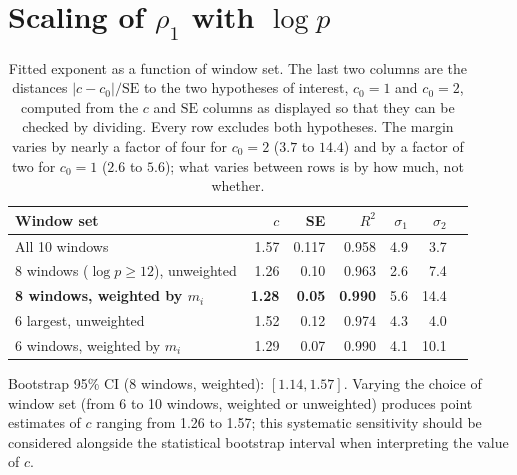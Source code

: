 \documentclass[11pt]{article}
\begin{document}
\section{Scaling of $\rho_1$ with $\log p$}\label{sec:scaling}

\begin{table}[H]\centering
\caption{Fitted exponent as a function of window set. The last two
columns are the distances $|c - c_0|/\mathrm{SE}$ to the two hypotheses
of interest, $c_0 = 1$ and $c_0 = 2$, computed from the $c$ and
$\mathrm{SE}$ columns as displayed so that they can be checked by
dividing. Every row excludes both hypotheses. The margin varies by
nearly a factor of four for $c_0 = 2$ ($3.7$ to $14.4$) and by a factor
of two for $c_0 = 1$ ($2.6$ to $5.6$); what varies between rows is by
how much, not whether.}
\label{tab:fitc}
\begin{tabular}{lrrrrrr}
\toprule
Window set & $c$ & SE & $R^2$ & $\sigma_{1}$ & $\sigma_{2}$ \\
\midrule
All 10 windows                     & 1.57 & 0.117 & 0.958 & 4.9 & 3.7 \\
8 windows ($\log p \ge 12$), unweighted & 1.26 & 0.10 & 0.963 & 2.6 & 7.4 \\
\textbf{8 windows, weighted by $m_i$}   & \textbf{1.28} & \textbf{0.05} & \textbf{0.990} & 5.6 & 14.4 \\
6 largest, unweighted              & 1.52 & 0.12 & 0.974 & 4.3 & 4.0 \\
6 windows, weighted by $m_i$       & 1.29 & 0.07 & 0.990 & 4.1 & 10.1 \\
\bottomrule
\end{tabular}
\end{table}

Bootstrap 95\% CI (8 windows, weighted): $[1.14, 1.57]$. Varying the
choice of window set (from 6 to 10 windows, weighted or unweighted)
produces point estimates of $c$ ranging from 1.26 to 1.57; this
systematic sensitivity should be considered alongside the statistical
bootstrap interval when interpreting the value of $c$.
\end{document}
